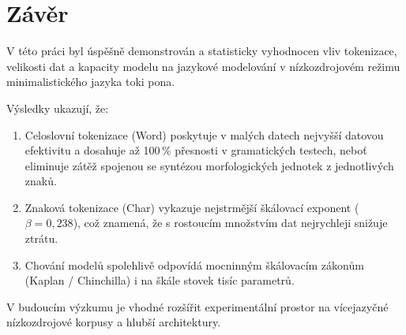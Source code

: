 \chapter{Závěr}
\label{chap:conclusion}

V této práci byl úspěšně demonstrován a statisticky vyhodnocen vliv tokenizace, velikosti dat a kapacity modelu na jazykové modelování v nízkozdrojovém režimu minimalistického jazyka toki pona.

Výsledky ukazují, že:
\begin{enumerate}
    \item Celoslovní tokenizace (Word) poskytuje v malých datech nejvyšší datovou efektivitu a dosahuje až 100\,\% přesnosti v gramatických testech, neboť eliminuje zátěž spojenou se syntézou morfologických jednotek z jednotlivých znaků.
    \item Znaková tokenizace (Char) vykazuje nejstrmější škálovací exponent ($\beta = 0{,}238$), což znamená, že s rostoucím množstvím dat nejrychleji snižuje ztrátu.
    \item Chování modelů spolehlivě odpovídá mocninným škálovacím zákonům (Kaplan / Chinchilla) i na škále stovek tisíc parametrů.
\end{enumerate}
V budoucím výzkumu je vhodné rozšířit experimentální prostor na vícejazyčné nízkozdrojové korpusy a hlubší architektury.
